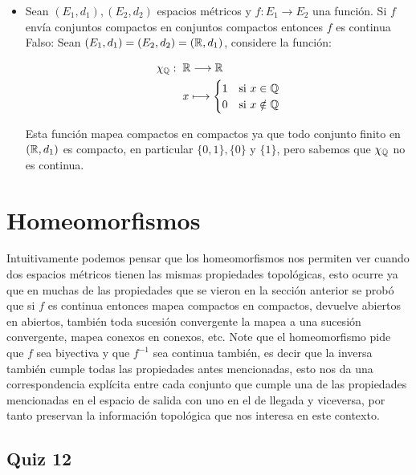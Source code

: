 \begin{itemize}[leftmargin=*]
\item  Sean $\left(E_1, d_1\right),\left(E_2, d_2\right)$ espacios métricos y $f: E_1 \rightarrow E_2$ una función. Si $f$ envía conjuntos compactos en conjuntos compactos entonces $f$ es continua\\

Falso: Sean $(E_1,d_1)=(E_2,d_2)=(\mathbb{R},d_1)$, considere la función:

\begin{align*}
    \chi_\mathbb{Q}: \hspace{2mm} &\mathbb{R} \longrightarrow \mathbb{R}\\
    &x \longmapsto \begin{cases}
        1 & \text{si } x\in \mathbb{Q}\\
        0 & \text{si } x \notin \mathbb{Q}
    \end{cases}
\end{align*}

Esta función mapea compactos en compactos ya que todo conjunto finito en $(\mathbb{R},d_1)$ es compacto, en particular $\{0,1\},\{0\}$ y $\{1\}$, pero sabemos que $\chi_{\mathbb{Q}}$ no es continua.

\end{itemize}

\section{Homeomorfismos}

Intuitivamente podemos pensar que los homeomorfismos nos permiten ver cuando dos espacios métricos tienen las mismas propiedades topológicas, esto ocurre ya que en muchas de las propiedades que se vieron en la sección anterior se probó que si $f$ es continua entonces mapea compactos en compactos, devuelve abiertos en abiertos, también toda sucesión convergente la mapea a una sucesión convergente, mapea conexos en conexos, etc. Note que el homeomorfismo pide que $f$ sea biyectiva y que $f^{-1}$ sea continua también, es decir que la inversa también cumple todas las propiedades antes mencionadas, esto nos da una correspondencia explícita entre cada conjunto que cumple una de las propiedades mencionadas en el espacio de salida con uno en el de llegada y viceversa, por tanto preservan la información topológica que nos interesa en este contexto.\\

\subsection{Quiz 12}

